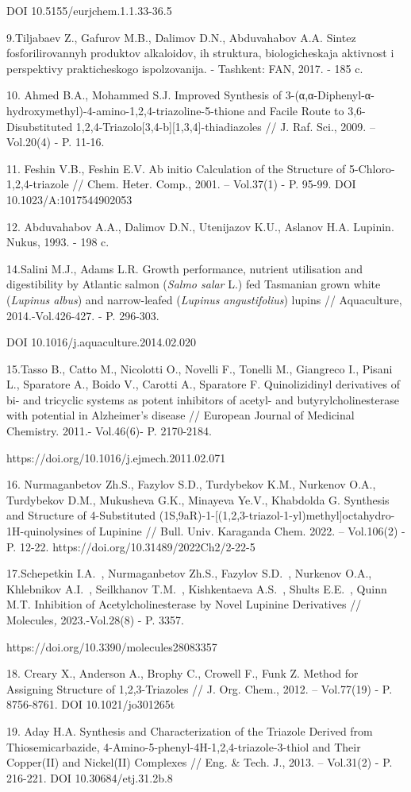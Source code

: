 \begin{noparindent}
DOI 10.5155/eurjchem.1.1.33-36.5

9.Tiljabaev Z., Gafurov M.B., Dalimov D.N., Abduvahabov A.A. Sintez
fosforilirovannyh produktov alkaloidov, ih struktura, biologicheskaja
aktivnost\textquotesingle{} i perspektivy prakticheskogo
ispol\textquotesingle zovanija. - Tashkent: FAN, 2017. - 185 c.

10. Ahmed B.A., Mohammed S.J. Improved Synthesis of
3-(α,α-Diphenyl-α-hydroxymethyl)-4-amino-1,2,4-triazoline-5-thione and
Facile Route to 3,6-Disubstituted
1,2,4-Triazolo{[}3,4-b{]}{[}1,3,4{]}-thiadiazoles // J. Raf. Sci., 2009.
-- Vol.20(4) - P. 11-16.

11. Feshin V.B., Feshin E.V. Ab initio Calculation of the Structure of
5-Chloro-1,2,4-triazole // Chem. Heter. Comp., 2001. -- Vol.37(1) - P.
95-99. DOI 10.1023/A:1017544902053

12. Abduvahabov A.A., Dalimov D.N., Utenijazov K.U., Aslanov H.A.
Lupinin. Nukus, 1993. - 198 c.

14.Salini M.J., Adams L.R. Growth performance, nutrient utilisation and
digestibility by Atlantic salmon (\emph{Salmo salar} L.) fed Tasmanian
grown white (\emph{Lupinus albus}) and narrow-leafed (\emph{Lupinus}
\emph{angustifolius}) lupins // Aquaculture, 2014.-Vol.426-427. - P.
296-303.

DOI 10.1016/j.aquaculture.2014.02.020

15.Tasso B., Catto M., Nicolotti O., Novelli F., Tonelli M., Giangreco
I., Pisani L., Sparatore A., Boido V., Carotti A., Sparatore F.
Quinolizidinyl derivatives of bi- and tricyclic systems as potent
inhibitors of acetyl- and butyrylcholinesterase with potential in
Alzheimer's disease // European Journal of Medicinal Chemistry. 2011.-
Vol.46(6)- P. 2170-2184.

https://doi.org/10.1016/j.ejmech.2011.02.071

16. Nurmaganbetov Zh.S., Fazylov S.D., Turdybekov K.M., Nurkenov O.A.,
Turdybekov D.M., Mukusheva G.K., Minayeva Ye.V., Khabdolda G. Synthesis
and Structure of 4-Substituted
(1S,9aR)-1-{[}(1,2,3-triazol-1-yl)methyl{]}octahydro-1H-quinolysines of
Lupinine // Bull. Univ. Karaganda Chem. 2022. -- Vol.106(2) - P. 12-22.
https://doi.org/10.31489/2022Ch2/2-22-5

17.Schepetkin I.A.~, Nurmaganbetov Zh.S., Fazylov S.D.~, Nurkenov O.A.,
Khlebnikov A.I.~, Seilkhanov T.M.~, Kishkentaeva A.S.~, Shults E.E.~,
Quinn M.T. Inhibition of Acetylcholinesterase by Novel Lupinine
Derivatives // Molecules\emph{,} 2023.-Vol.28(8) - P. 3357.

https://doi.org/10.3390/molecules28083357

18. Creary X., Anderson A., Brophy C., Crowell F., Funk Z. Method for
Assigning Structure of 1,2,3-Triazoles // J. Org. Chem., 2012. --
Vol.77(19) - P. 8756-8761. DOI 10.1021/jo301265t

19. Aday H.A. Synthesis and Characterization of the Triazole Derived
from Thiosemicarbazide, 4-Amino-5-phenyl-4H-1,2,4-triazole-3-thiol and
Their Copper(II) and Nickel(II) Complexes // Eng. \& Tech. J., 2013. --
Vol.31(2) - P. 216-221. DOI 10.30684/etj.31.2b.8
\end{noparindent}

